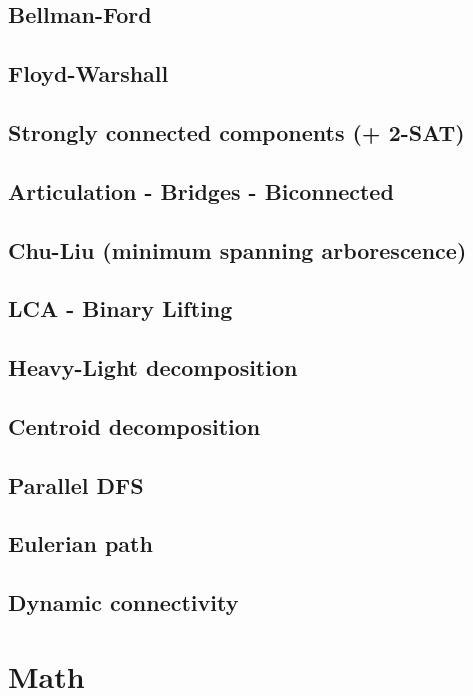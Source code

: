 \subsection{Bellman-Ford}
\subsection{Floyd-Warshall}
\subsection{Strongly connected components (+ 2-SAT)}
\subsection{Articulation - Bridges - Biconnected}
\subsection{Chu-Liu (minimum spanning arborescence)}
\subsection{LCA - Binary Lifting}
\subsection{Heavy-Light decomposition}
\subsection{Centroid decomposition}
\subsection{Parallel DFS}
\subsection{Eulerian path}
\subsection{Dynamic connectivity}

\section{Math}
